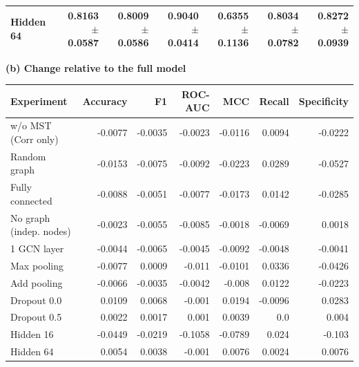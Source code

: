 \begin{table}[t]
{\begin{tabular}{lrrrrrr}
Hidden 64 & 0.8163 $\pm$ 0.0587 & 0.8009 $\pm$ 0.0586 & 0.9040 $\pm$ 0.0414 & 0.6355 $\pm$ 0.1136 & 0.8034 $\pm$ 0.0782 & 0.8272 $\pm$ 0.0939 \\
\bottomrule
\end{tabular}
}
\vspace{7pt}
\textbf{(b) Change relative to the full model}\\[2pt]
\begin{tabular}{lrrrrrr}
\toprule
Experiment & Accuracy & F1 & ROC-AUC & MCC & Recall & Specificity \\
\midrule
w/o MST (Corr only) & -0.0077 & -0.0035 & -0.0023 & -0.0116 & 0.0094 & -0.0222 \\
Random graph & -0.0153 & -0.0075 & -0.0092 & -0.0223 & 0.0289 & -0.0527 \\
Fully connected & -0.0088 & -0.0051 & -0.0077 & -0.0173 & 0.0142 & -0.0285 \\
No graph (indep. nodes) & -0.0023 & -0.0055 & -0.0085 & -0.0018 & -0.0069 & 0.0018 \\
1 GCN layer & -0.0044 & -0.0065 & -0.0045 & -0.0092 & -0.0048 & -0.0041 \\
Max pooling & -0.0077 & 0.0009 & -0.011 & -0.0101 & 0.0336 & -0.0426 \\
Add pooling & -0.0066 & -0.0035 & -0.0042 & -0.008 & 0.0122 & -0.0223 \\
Dropout 0.0 & 0.0109 & 0.0068 & -0.001 & 0.0194 & -0.0096 & 0.0283 \\
Dropout 0.5 & 0.0022 & 0.0017 & 0.001 & 0.0039 & 0.0 & 0.004 \\
Hidden 16 & -0.0449 & -0.0219 & -0.1058 & -0.0789 & 0.024 & -0.103 \\
Hidden 64 & 0.0054 & 0.0038 & -0.001 & 0.0076 & 0.0024 & 0.0076 \\
\bottomrule
\end{tabular}
\end{table}
